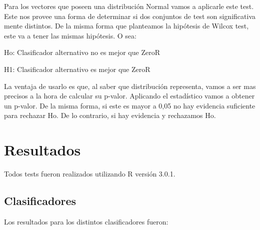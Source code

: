 \documentclass[11pt,a4paper,twoside]{tesis}
\begin{document}

Para los vectores que poseen una distribución Normal vamos a aplicarle este test. Este nos provee una forma de determinar si dos conjuntos de test son significativa mente distintos. De la misma forma que planteamos la hipótesis de Wilcox test, este va a tener las mismas hipótesis. O sea: 

\vspace{0.5cm}
\hspace{2cm}Ho: Clasificador alternativo no es mejor que ZeroR
\vspace{0.25cm}

\hspace{2cm}H1: Clasificador alternativo es mejor que ZeroR
\vspace{0.5cm}

La ventaja de usarlo es que, al saber que distribución representa, vamos a ser mas precisos a la hora de calcular su p-valor. Aplicando el estadístico vamos a obtener un p-valor. De la misma forma, si este es mayor a 0,05 no hay evidencia suficiente para rechazar Ho. De lo contrario, si hay evidencia y rechazamos Ho.

\section{Resultados}

Todos tests fueron realizados utilizando R versión 3.0.1.

\subsection{Clasificadores}
Los resultados para los distintos clasificadores fueron:
\end{document}
